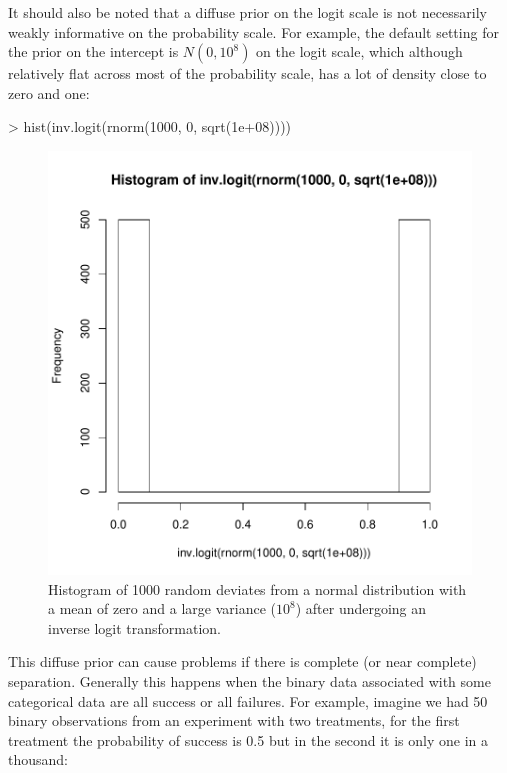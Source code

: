 \documentclass{article}
\begin{document}
It should also be noted that a diffuse prior on the logit scale is not necessarily weakly informative on the probability scale. For example, the default setting for the prior on the intercept is $N(0, 10^{8})$ on the logit scale, which although relatively flat across most of the probability scale, has a lot of density close to zero and one:


\begin{Schunk}
\begin{Sinput}
> hist(inv.logit(rnorm(1000, 0, sqrt(1e+08))))
\end{Sinput}
\end{Schunk}

\begin{figure}[!h]
\begin{center}
\includegraphics{Lecture2-071}
\end{center}
\caption{Histogram of 1000 random deviates from a normal distribution with a mean of zero and a large variance ($10^8$) after undergoing an inverse logit transformation.}
\label{invlogit-fig}
\end{figure}

This diffuse prior can cause problems if there is complete (or near complete) separation. Generally this happens when the binary data associated with some categorical data are all success or all failures. For example, imagine we had 50 binary observations from an experiment with two treatments, for the first treatment the probability of success is 0.5 but in the second it is only one in a thousand:
\end{document}
